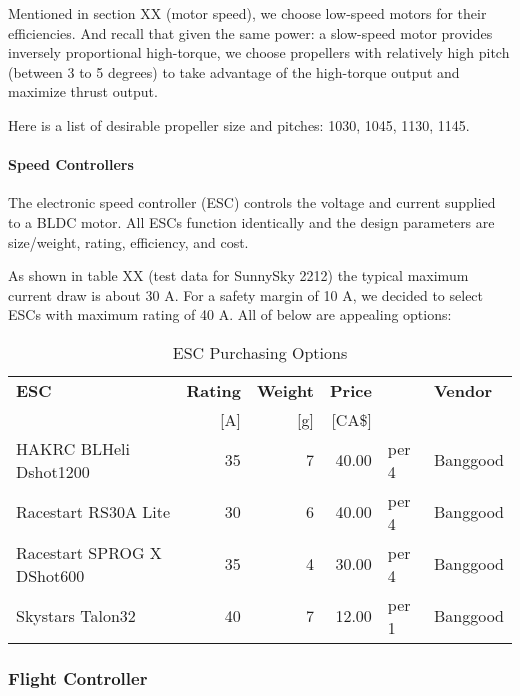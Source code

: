 Mentioned in section XX (motor speed), we choose low-speed motors for their efficiencies. And recall that 
given the same power: a slow-speed motor provides inversely proportional high-torque, we choose propellers 
with relatively high pitch (between 3 to 5 degrees) to take advantage of the high-torque output and 
maximize thrust output.

Here is a list of desirable propeller size and pitches: 1030, 1045, 1130, 1145.

\paragraph{Speed Controllers}

The electronic speed controller (ESC) controls the voltage and current supplied to a BLDC motor. All ESCs 
function identically and the design parameters are size/weight, rating, efficiency, and cost.

As shown in table XX (test data for SunnySky 2212) the typical maximum current draw is about 30 A. For a 
safety margin of 10 A, we decided to select ESCs with maximum rating of 40 A. All of below are appealing 
options:

\begin{table}[H]
    \centering
    \caption{ESC Purchasing Options}
    \label{table:esc-table}

    \begin{tabular}{lrrrll}

    \hline
    \textbf{ESC} & \textbf{Rating} & \textbf{Weight} & \textbf{Price}  & & \textbf{Vendor}\\
    & [A] & [g] & [CA\$] & & \\
    \hline
    HAKRC BLHeli Dshot1200 & 35 & 7  & 40.00 & per 4 & Banggood\\
    Racestart RS30A Lite & 30 & 6  & 40.00 & per 4 & Banggood\\
    Racestart SPROG X DShot600 & 35 & 4  & 30.00 & per 4 & Banggood\\
    Skystars Talon32 & 40 & 7  & 12.00 & per 1 & Banggood\\
    \hline

    \end{tabular} 
\end{table}

\subsubsection{Flight Controller}

